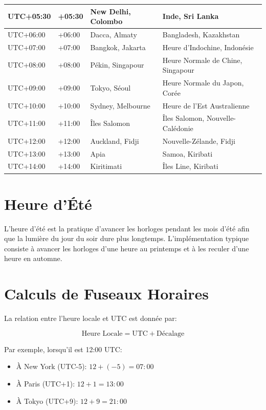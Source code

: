 \documentclass[12pt]{article}
\begin{document}
\begin{longtable}{|p{3cm}|p{2cm}|p{3cm}|p{5cm}|}
\hline
UTC+05:30 & +05:30 & New Delhi, Colombo & Inde, Sri Lanka \\
\hline
UTC+06:00 & +06:00 & Dacca, Almaty & Bangladesh, Kazakhstan \\
\hline
UTC+07:00 & +07:00 & Bangkok, Jakarta & Heure d'Indochine, Indonésie \\
\hline
UTC+08:00 & +08:00 & Pékin, Singapour & Heure Normale de Chine, Singapour \\
\hline
UTC+09:00 & +09:00 & Tokyo, Séoul & Heure Normale du Japon, Corée \\
\hline
UTC+10:00 & +10:00 & Sydney, Melbourne & Heure de l'Est Australienne \\
\hline
UTC+11:00 & +11:00 & Îles Salomon & Îles Salomon, Nouvelle-Calédonie \\
\hline
UTC+12:00 & +12:00 & Auckland, Fidji & Nouvelle-Zélande, Fidji \\
\hline
UTC+13:00 & +13:00 & Apia & Samoa, Kiribati \\
\hline
UTC+14:00 & +14:00 & Kiritimati & Îles Line, Kiribati \\
\hline
\end{longtable}

\section{Heure d'Été}

L'heure d'été est la pratique d'avancer les horloges pendant les mois d'été afin que la lumière du jour du soir dure plus longtemps. L'implémentation typique consiste à avancer les horloges d'une heure au printemps et à les reculer d'une heure en automne.

\section{Calculs de Fuseaux Horaires}

La relation entre l'heure locale et UTC est donnée par:

\begin{equation}
\text{Heure Locale} = \text{UTC} + \text{Décalage}
\end{equation}

Par exemple, lorsqu'il est 12:00 UTC:
\begin{itemize}
\item À New York (UTC-5): $12 + (-5) = 07:00$
\item À Paris (UTC+1): $12 + 1 = 13:00$
\item À Tokyo (UTC+9): $12 + 9 = 21:00$
\end{itemize}
\end{document}
